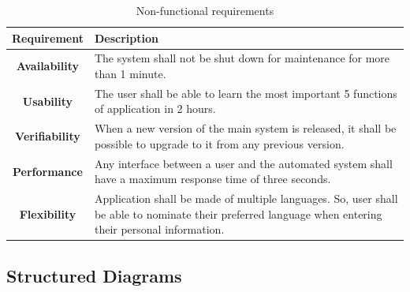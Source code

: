 \documentclass[12pt, oneside, a4paper]{book}
\newcommand\boldcolor[1]{\textcolor{bold}{\textbf{#1}}}
\begin{document}
				\begin{table}[H]
					\caption{Non-functional requirements}
					\begin{center}
						\begin{tabularx}{\linewidth}{|c|X|}\hline
							\boldcolor{Requirement} & \boldcolor{Description}\\\hline
							\textbf{Availability} & The system shall not be shut down for maintenance for more than 1 minute. \\\hline
							\textbf{Usability} & The user shall be able to learn the most important 5 functions of application in 2 hours.  \\\hline
							\textbf{Verifiability} & When a new version of the main system is released, it shall be possible to upgrade to it from any previous version. \\\hline
							\textbf{Performance} & Any interface between a user and the automated system shall have a maximum response time of three seconds. \\\hline
							\textbf{Flexibility} & Application shall be made of multiple languages. So, user shall be able to nominate their preferred language when entering their personal information. \\\hline
						\end{tabularx}
					\end{center}
				\end{table}
			\newpage\subsection{Structured Diagrams}
\end{document}

